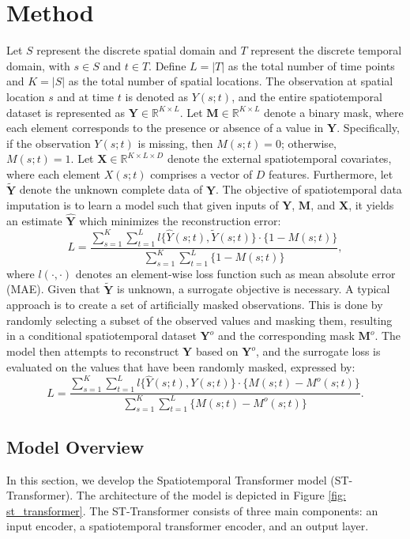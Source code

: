 \documentclass[review]{elsarticle}
\begin{document}
\section{Method}\label{sec: method}
Let $S$ represent the discrete spatial domain and $T$ represent the discrete temporal domain, with $s \in S$ and $t \in T$. Define $L=|T|$ as the total number of time points and $K=|S|$ as the total number of spatial locations. The observation at spatial location $s$ and at time $t$ is denoted as $Y(s;t)$, and the entire spatiotemporal dataset is represented as $\boldsymbol{Y} \in \mathbb{R}^{K\times L}$.
 Let $\boldsymbol{M} \in \mathbb{R}^{K \times L}$ denote a binary mask, where each element corresponds to the presence or absence of a value in $\boldsymbol{Y}$. Specifically, if the observation $Y(s;t)$ is missing, then $M(s;t) = 0$; otherwise, $M(s;t) = 1$. Let $\boldsymbol{X} \in \mathbb{R}^{K \times L \times D}$ denote the external spatiotemporal covariates, where each element $X(s;t)$ comprises a vector of $D$ features. Furthermore, let $\tilde{\boldsymbol{Y}}$ denote the unknown complete data of $\boldsymbol{Y}$. The objective of spatiotemporal data imputation is to learn a model such that given inputs of $\boldsymbol{Y}$, $\boldsymbol{M}$, and $\boldsymbol{X}$, it yields an estimate $\hat{\boldsymbol{Y}}$ which minimizes the reconstruction error:
\begin{equation}
	L = \frac{\sum_{s=1}^K \sum_{t=1}^L l\{\hat{Y}(s;t), \tilde{Y}(s;t)\} \cdot \{1-M(s;t)\}}{\sum_{s=1}^{K}\sum_{t=1}^{L}\{1-M(s;t)\}},
\end{equation}
where $l(\cdot, \cdot)$ denotes an element-wise loss function such as mean absolute error (MAE). Given that $\tilde{\boldsymbol{Y}}$ is unknown, a surrogate objective is necessary. A typical approach is to create a set of artificially masked observations. This is done by randomly selecting a subset of the observed values and masking them, resulting in a conditional spatiotemporal dataset $\boldsymbol{Y}^{o}$ and the corresponding mask $\boldsymbol{M}^{o}$. The model then attempts to reconstruct $\boldsymbol{Y}$ based on $\boldsymbol{Y}^{o}$, and the surrogate loss is evaluated on the values that have been randomly masked, expressed by:
\begin{equation}
	L = \frac{\sum_{s=1}^K \sum_{t=1}^L l\{\hat{Y}(s;t), Y(s;t)\} \cdot \{M(s;t)-M^{o}(s;t)\}}{\sum_{s=1}^{K}\sum_{t=1}^{L}\{M(s;t)-M^{o}(s;t)\}}.
	\label{eq: loss function}
\end{equation}


\subsection{Model Overview}
In this section, we develop the Spatiotemporal Transformer model (ST-Transformer). The architecture of the model is depicted in Figure \ref{fig: st_transformer}. The ST-Transformer consists of three main components: an input encoder, a spatiotemporal transformer encoder, and an output layer. 
\end{document}
